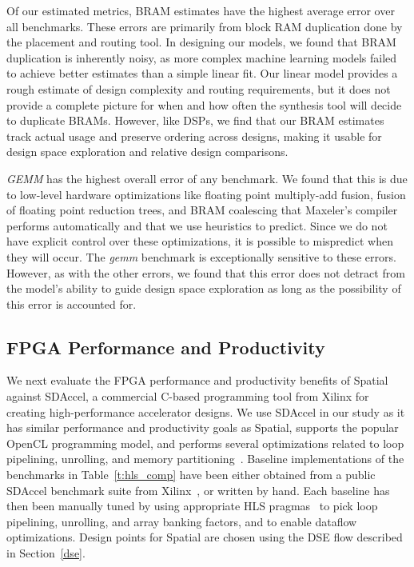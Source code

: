 Of our estimated metrics, BRAM estimates have the highest average error over all benchmarks. These errors are primarily from block RAM duplication done by the placement and routing tool. In designing our models, we found that BRAM duplication is inherently noisy, as more complex machine learning models failed to achieve better estimates than a simple linear fit. Our linear model provides a rough estimate of design complexity and routing requirements, but it does not provide a complete picture for when and how often the synthesis tool will decide to duplicate BRAMs. However, like DSPs, we find that our BRAM estimates track actual usage and preserve ordering across designs, making it usable for design space exploration and relative design comparisons.

\emph{GEMM} has the highest overall error of any benchmark. We found that this is due to low-level hardware optimizations like floating point multiply-add fusion, fusion of floating point reduction trees, and BRAM coalescing that Maxeler's compiler performs automatically and that we use heuristics to predict. Since we do not have explicit control over these optimizations, it is possible to mispredict when they will occur. The \emph{gemm} benchmark is exceptionally sensitive to these errors. However, as with the other errors, we found that this error does not detract from the model's ability to guide design space exploration as long as the possibility of this error is accounted for.


\subsection{FPGA Performance and Productivity}



We next evaluate the FPGA performance and productivity benefits of Spatial against SDAccel, a commercial C-based programming tool from Xilinx for creating high-performance accelerator designs. We use SDAccel in our study as it has similar performance and productivity goals as Spatial, supports the popular OpenCL programming model, and performs several optimizations related to loop pipelining, unrolling, and memory partitioning~\cite{sdaccel}. Baseline implementations of the benchmarks in Table~\ref{t:hls_comp} have been either obtained from a public SDAccel benchmark suite from Xilinx~\cite{sdaccelBench}, or written by hand. Each baseline has then been manually tuned by using appropriate HLS pragmas~\cite{hlsPragmaRef} to pick loop pipelining, unrolling, and array banking factors, and to enable dataflow optimizations. Design points for Spatial are chosen using the DSE flow described in Section~\ref{dse}.

